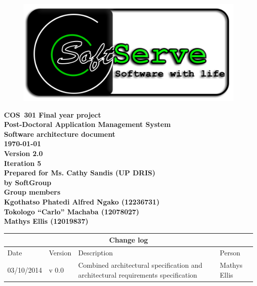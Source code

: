 \documentclass[12pt]{article}
\newcommand{\Title}{Software architecture document} %
\newcommand{\Class}{COS\ 301 Final year project} %
\newcommand{\ssr}{Soft\color{green}{Serve }\color{black}}
\newcommand{\version}{2.0}
\newcommand{\iteration}{5}
\newcommand{\client}{Ms. Cathy Sandis (UP DRIS)}
\newcommand{\project}{Post-Doctoral Application Management System}
\begin{document}
\vspace{4em}

\begin{center}%

\begin{figure}[ht!]
\centering
\includegraphics{../Images_Docs/logo.png}
\end{figure}
\LARGE \bf \Class \\[0.25em]
\LARGE \bf \project \\[1em]
\LARGE \bf \Title \\[0.25em]
\large \bf \today\\
\bf Version \version\\
\bf Iteration \iteration\\[0.5em]
\Large \bf Prepared for \client\\
\Large \bf by
\Large {\bf \ssr Group }\\[0.5em]
\LARGE {\bf Group members}\\[0.25em]
\large
Kgothatso Phatedi Alfred Ngako (12236731) \\[0.5em]
Tokologo “Carlo” Machaba (12078027) \\[0.5em]
Mathys Ellis (12019837) \\[8em]

\end{center}%


\begin{center}
\begin{tabular}{|l|p{1.4cm}|p{8cm}|p{2.8cm}|}
\hline
\multicolumn{4}{|c|}{\bf Change log} \\
\hline
 Date & Version & Description &  Person \\
\hline
03/10/2014 & v 0.0 & Combined architectural specification and architectural requirements specification & Mathys Ellis \\

\end{tabular}
\end{center}
\newpage
\tableofcontents
\end{document}
